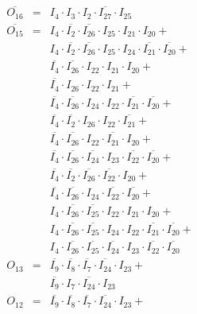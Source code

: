 \documentclass[a4paper,russian]{report}
\begin{document}
\begin{eqnarray*}
    \overline{O_{16}} & = & I_{4} \cdotp I_{3} \cdotp I_{2} \cdotp \overline{I_{27}} \cdotp I_{25} \\
    \overline{O_{15}} & = & I_{4} \cdotp \overline{I_{2}} \cdotp \overline{I_{26}} \cdotp I_{25} \cdotp I_{21} \cdotp I_{20} + \\
	& &  I_{4} \cdotp \overline{I_{2}} \cdotp \overline{I_{26}} \cdotp I_{25} \cdotp I_{24} \cdotp \overline{I_{21}} \cdotp \overline{I_{20}} + \\
	& &  \overline{I_{4}} \cdotp \overline{I_{26}} \cdotp I_{22} \cdotp I_{21} \cdotp I_{20} + \\
	& &  \overline{I_{4}} \cdotp I_{26} \cdotp I_{22} \cdotp I_{21} + \\
	& &  \overline{I_{4}} \cdotp \overline{I_{26}} \cdotp I_{24} \cdotp I_{22} \cdotp \overline{I_{21}} \cdotp \overline{I_{20}} + \\
	& &  \overline{I_{4}} \cdotp \overline{I_{2}} \cdotp I_{26} \cdotp I_{22} \cdotp \overline{I_{21}} + \\
	& &  \overline{I_{4}} \cdotp \overline{I_{26}} \cdotp I_{22} \cdotp \overline{I_{21}} \cdotp I_{20} + \\
	& &  \overline{I_{4}} \cdotp \overline{I_{26}} \cdotp \overline{I_{24}} \cdotp I_{23} \cdotp \overline{I_{22}} \cdotp \overline{I_{20}} + \\
	& &  \overline{I_{4}} \cdotp \overline{I_{2}} \cdotp \overline{I_{26}} \cdotp \overline{I_{22}} \cdotp I_{20} + \\
	& &  \overline{I_{4}} \cdotp \overline{I_{26}} \cdotp I_{24} \cdotp \overline{I_{22}} \cdotp \overline{I_{20}} + \\
	& &  I_{4} \cdotp \overline{I_{26}} \cdotp \overline{I_{25}} \cdotp I_{22} \cdotp I_{21} \cdotp I_{20} + \\
	& &  I_{4} \cdotp \overline{I_{26}} \cdotp \overline{I_{25}} \cdotp I_{24} \cdotp I_{22} \cdotp \overline{I_{21}} \cdotp \overline{I_{20}} + \\
	& &  I_{4} \cdotp \overline{I_{26}} \cdotp \overline{I_{25}} \cdotp \overline{I_{24}} \cdotp I_{23} \cdotp \overline{I_{22}} \cdotp \overline{I_{20}} \\
    O_{13} & = & \overline{I_{9}} \cdotp \overline{I_{8}} \cdotp \overline{I_{7}} \cdotp \overline{I_{24}} \cdotp I_{23} + \\
	& &  \overline{I_{9}} \cdotp I_{7} \cdotp \overline{I_{24}} \cdotp I_{23} \\
    O_{12} & = & \overline{I_{9}} \cdotp \overline{I_{8}} \cdotp \overline{I_{7}} \cdotp \overline{I_{24}} \cdotp I_{23} + \\

\end{eqnarray*}
\end{document}
